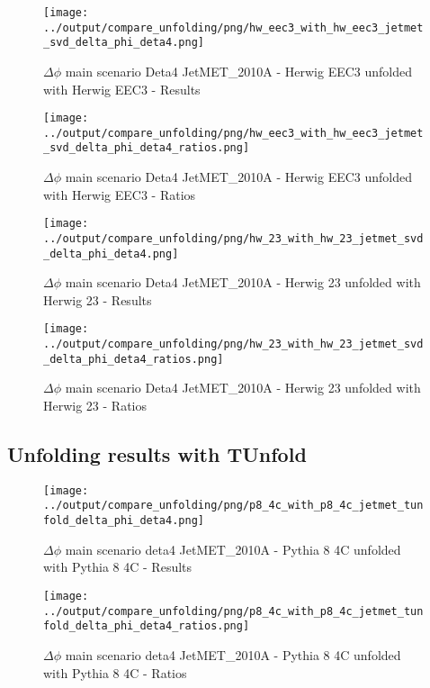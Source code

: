 \documentclass[11pt]{book}
\begin{document}
\begin{figure}[ht]
\centering
\texttt{[image: ../output/compare\_unfolding/png/hw\_eec3\_with\_hw\_eec3\_jetmet\_svd\_delta\_phi\_deta4.png]}
\caption{$\Delta\phi$ main scenario Deta4 JetMET\_2010A - Herwig EEC3 unfolded with Herwig EEC3 - Results}
\label{hw_eec3_hw_eec3_jetmet_svd_delta_phi_deta4_a}
\end{figure}

\begin{figure}[ht]
\centering
\texttt{[image: ../output/compare\_unfolding/png/hw\_eec3\_with\_hw\_eec3\_jetmet\_svd\_delta\_phi\_deta4\_ratios.png]}
\caption{$\Delta\phi$ main scenario Deta4 JetMET\_2010A - Herwig EEC3 unfolded with Herwig EEC3 - Ratios}
\label{hw_eec3_hw_eec3_jetmet_svd_delta_phi_deta4_b}
\end{figure}

\begin{figure}[ht]
\centering
\texttt{[image: ../output/compare\_unfolding/png/hw\_23\_with\_hw\_23\_jetmet\_svd\_delta\_phi\_deta4.png]}
\caption{$\Delta\phi$ main scenario Deta4 JetMET\_2010A - Herwig 23 unfolded with Herwig 23 - Results}
\label{hw_23_hw_23_jetmet_svd_delta_phi_deta4_a}
\end{figure}

\begin{figure}[ht]
\centering
\texttt{[image: ../output/compare\_unfolding/png/hw\_23\_with\_hw\_23\_jetmet\_svd\_delta\_phi\_deta4\_ratios.png]}
\caption{$\Delta\phi$ main scenario Deta4 JetMET\_2010A - Herwig 23 unfolded with Herwig 23 - Ratios}
\label{hw_23_hw_23_jetmet_svd_delta_phi_deta4_b}
\end{figure}




\clearpage
\subsection{Unfolding results with TUnfold}

\begin{figure}[ht]
\centering
\texttt{[image: ../output/compare\_unfolding/png/p8\_4c\_with\_p8\_4c\_jetmet\_tunfold\_delta\_phi\_deta4.png]}
\caption{$\Delta\phi$ main scenario deta4 JetMET\_2010A - Pythia 8 4C unfolded with Pythia 8 4C - Results}
\label{p8_p8_jetmet_tunfold_delta_phi_deta4_a}
\end{figure}

\begin{figure}[ht]
\centering
\texttt{[image: ../output/compare\_unfolding/png/p8\_4c\_with\_p8\_4c\_jetmet\_tunfold\_delta\_phi\_deta4\_ratios.png]}
\caption{$\Delta\phi$ main scenario deta4 JetMET\_2010A - Pythia 8 4C unfolded with Pythia 8 4C - Ratios}
\label{p8_p8_jetmet_tunfold_delta_phi_deta4_b}
\end{figure}
\end{document}
